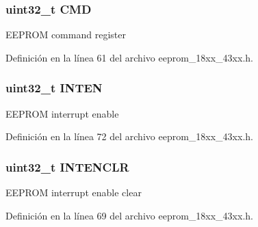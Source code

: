 \subsubsection[{\texorpdfstring{C\+MD}{CMD}}]{ uint32\+\_\+t C\+MD}\hypertarget{struct_l_p_c___e_e_p_r_o_m___t_adcf812cbe5147d300507d59d4a55935d}{}\label{struct_l_p_c___e_e_p_r_o_m___t_adcf812cbe5147d300507d59d4a55935d}
E\+E\+P\+R\+OM command register 

Definición en la línea 61 del archivo eeprom\+\_\+18xx\+\_\+43xx.\+h.

\subsubsection[{\texorpdfstring{I\+N\+T\+EN}{INTEN}}]{ uint32\+\_\+t I\+N\+T\+EN}\hypertarget{struct_l_p_c___e_e_p_r_o_m___t_a0d56d547a72165926c5db3ea2ae78ff5}{}\label{struct_l_p_c___e_e_p_r_o_m___t_a0d56d547a72165926c5db3ea2ae78ff5}
E\+E\+P\+R\+OM interrupt enable 

Definición en la línea 72 del archivo eeprom\+\_\+18xx\+\_\+43xx.\+h.

\subsubsection[{\texorpdfstring{I\+N\+T\+E\+N\+C\+LR}{INTENCLR}}]{ uint32\+\_\+t I\+N\+T\+E\+N\+C\+LR}\hypertarget{struct_l_p_c___e_e_p_r_o_m___t_af2a29e6fb0e6d5c0037de7b84fd51baa}{}\label{struct_l_p_c___e_e_p_r_o_m___t_af2a29e6fb0e6d5c0037de7b84fd51baa}
E\+E\+P\+R\+OM interrupt enable clear 

Definición en la línea 69 del archivo eeprom\+\_\+18xx\+\_\+43xx.\+h.

